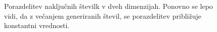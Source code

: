 \documentclass[slovene,11pt,a4paper]{article}
\numberwithin{equation}{section} %
\numberwithin{figure}{section} %
\numberwithin{table}{section} %
\begin{document}
\begin{figure}[h]
\noindent{}
\caption{Porazdelitev naključnih številk v dveh dimenzijah. Ponovno se lepo vidi, da z večanjem generiranih števil, se porazdelitev približuje konstantni vrednosti.}
\end{figure}
\end{document}
